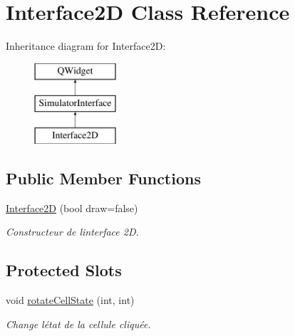 \hypertarget{class_interface2_d}{}\section{Interface2D Class Reference}
\label{class_interface2_d}
Inheritance diagram for Interface2D\+:\begin{figure}[H]
\begin{center}
\leavevmode
\includegraphics[height=3.000000cm]{class_interface2_d}
\end{center}
\end{figure}
\subsection*{Public Member Functions}
\begin{DoxyCompactItemize}
\item 
\mbox{\hyperlink{class_interface2_d_a8a7b688756ef687fd15059a526278170}{Interface2D}} (bool draw=false)
\begin{DoxyCompactList}\small\item\em Constructeur de l\textquotesingle{}interface 2D. \end{DoxyCompactList}\end{DoxyCompactItemize}
\subsection*{Protected Slots}
\begin{DoxyCompactItemize}
\item 
void \mbox{\hyperlink{class_interface2_d_ac9b111f941584c6858c2fc293921cd58}{rotate\+Cell\+State}} (int, int)
\begin{DoxyCompactList}\small\item\em Change l\textquotesingle{}état de la cellule cliquée. \end{DoxyCompactList}\end{DoxyCompactItemize}
